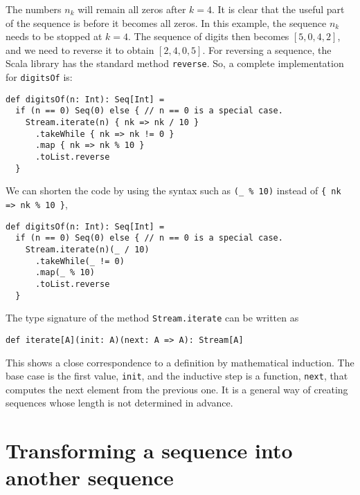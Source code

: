 \noindent The numbers $n_{k}$ will remain all zeros after $k=4$.
It is clear that the useful part of the sequence is before it becomes
all zeros. In this example, the sequence $n_{k}$ needs to be stopped
at $k=4$. The sequence of digits then becomes $\left[5,0,4,2\right]$,
and we need to reverse it to obtain $\left[2,4,0,5\right]$. For reversing
a sequence, the Scala library has the standard method \lstinline!reverse!.
So, a complete implementation for \lstinline!digitsOf! is:
\begin{lstlisting}
def digitsOf(n: Int): Seq[Int] =
  if (n == 0) Seq(0) else { // n == 0 is a special case.
    Stream.iterate(n) { nk => nk / 10 }
      .takeWhile { nk => nk != 0 }
      .map { nk => nk % 10 }
      .toList.reverse
  }
\end{lstlisting}
We can shorten the code by using the syntax such as \lstinline!(_ % 10)!
instead of \lstinline!{ nk => nk % 10 }!, 
\begin{lstlisting}
def digitsOf(n: Int): Seq[Int] =
  if (n == 0) Seq(0) else { // n == 0 is a special case.
    Stream.iterate(n)(_ / 10)
      .takeWhile(_ != 0)
      .map(_ % 10)
      .toList.reverse
  }
\end{lstlisting}

The type signature of the method \lstinline!Stream.iterate! can be
written as
\begin{lstlisting}
def iterate[A](init: A)(next: A => A): Stream[A]
\end{lstlisting}
This shows a close correspondence to a definition by mathematical
induction. The base case is the first value, \lstinline!init!, and
the inductive step is a function, \lstinline!next!, that computes
the next element from the previous one. It is a general way of creating
sequences whose length is not determined in advance.

\section{Transforming a sequence into another sequence}

